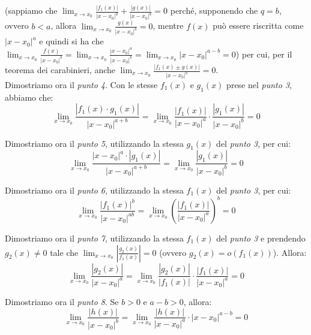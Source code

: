 \documentclass{article}
\begin{document}
\noindent (sappiamo che $\lim_{x \to x_0} \frac{|f_1(x)|}{|x - x_0|^q} + \frac{|g(x)|}{|x - x_0|^q} = 0$ perché, supponendo che $q = b$, ovvero $b < a$, allora $\lim_{x \to x_0} \frac{g(x)}{|x - x_0|^b} = 0$, mentre $f(x)$ può essere riscritta come $|x - x_0|^a$ e quindi si ha che $\lim_{x \to x_0} \frac{f(x)}{|x - x_0|^b} = \lim_{x \to x_0} \frac{|x - x_0|^a}{|x - x_0|^b} = \lim_{x \to x_0} |x - x_0|^{a - b} = 0$) per cui, per il teorema dei carabinieri, anche $\lim_{x \to x_0} \frac{|f_1(x) \pm g(x)|}{|x - x_0|^q} = 0$.\\
Dimostriamo ora il \textit{punto 4}. Con le stesse $f_1(x)$ e $g_1(x)$ prese nel \textit{punto 3}, abbiamo che:
\begin{equation*}
    \lim_{x \to x_0} \frac{|f_1(x) \cdot g_1(x)|}{|x - x_0|^{a + b}} = \lim_{x \to x_0} \frac{|f_1(x)|}{|x - x_0|^a} \cdot \frac{|g_1(x)|}{|x - x_0|^b} = 0
\end{equation*}

\noindent Dimostriamo ora il \textit{punto 5}, utilizzando la stessa $g_1(x)$ del \textit{punto 3}, per cui:
\begin{equation*}
    \lim_{x \to x_0} \frac{|x - x_0|^a \cdot |g_1(x)|}{|x - x_0|^{a + b}} = \lim_{x \to x_0} \frac{|g_1(x)|}{|x - x_0|^b} = 0
\end{equation*}

\noindent Dimostriamo ora il \textit{punto 6}, utilizzando la stessa $f_1(x)$ del \textit{punto 3}, per cui:
\begin{equation*}
    \lim_{x \to x_0} \frac{|f_1(x)|^b}{|x - x_0|^{ab}} = \lim_{x \to x_0} \left(\frac{|f_1(x)|}{|x - x_0|^a}\right)^b = 0
\end{equation*}

\noindent Dimostriamo ora il \textit{punto 7}, utilizzando la stessa $f_1(x)$ del \textit{punto 3} e prendendo $g_2(x) \neq 0$ tale che $\lim_{x \to x_0} \left|\frac{g_2(x)}{f_1(x)}\right| = 0$ (ovvero $g_2(x) = o(f_1(x))$). Allora:
\begin{equation*}
    \lim_{x \to x_0} \frac{|g_2(x)|}{|x - x_0|^a} = \lim_{x \to x_0} \frac{|g_2(x)|}{|f_1(x)|} \cdot \frac{|f_1(x)|}{|x - x_0|^a} = 0
\end{equation*}

\noindent Dimostriamo ora il \textit{punto 8}. Se $b > 0$ e $a - b > 0$, allora:
\begin{equation*}
    \lim_{x \to x_0} \frac{|h(x)|}{|x - x_0|^b} = \lim_{x \to x_0} \frac{|h(x)|}{|x - x_0|^a} \cdot |x - x_0|^{a - b} = 0
\end{equation*}
\end{document}
